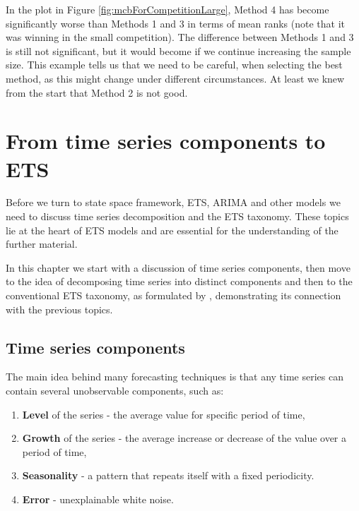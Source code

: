 \documentclass[
]{book}
\providecommand{\tightlist}{%
  \setlength{\itemsep}{0pt}\setlength{\parskip}{0pt}}
\theoremstyle{definition}
\theoremstyle{definition}
\theoremstyle{definition}
\theoremstyle{definition}
\theoremstyle{remark}
\begin{document}
In the plot in Figure \ref{fig:mcbForCompetitionLarge}, Method 4 has become significantly worse than Methods 1 and 3 in terms of mean ranks (note that it was winning in the small competition). The difference between Methods 1 and 3 is still not significant, but it would become if we continue increasing the sample size. This example tells us that we need to be careful, when selecting the best method, as this might change under different circumstances. At least we knew from the start that Method 2 is not good.

\hypertarget{tsDecomposition}{%
\chapter{From time series components to ETS}\label{tsDecomposition}}

Before we turn to state space framework, ETS, ARIMA and other models we need to discuss time series decomposition and the ETS taxonomy. These topics lie at the heart of ETS models and are essential for the understanding of the further material.

In this chapter we start with a discussion of time series components, then move to the idea of decomposing time series into distinct components and then to the conventional ETS taxonomy, as formulated by \citet{Hyndman2008b}, demonstrating its connection with the previous topics.

\hypertarget{tsComponents}{%
\section{Time series components}\label{tsComponents}}

The main idea behind many forecasting techniques is that any time series can contain several unobservable components, such as:

\begin{enumerate}
\def\labelenumi{\arabic{enumi}.}
\tightlist
\item
  \textbf{Level} of the series - the average value for specific period of time,
\item
  \textbf{Growth} of the series - the average increase or decrease of the value over a period of time,
\item
  \textbf{Seasonality} - a pattern that repeats itself with a fixed periodicity.
\item
  \textbf{Error} - unexplainable white noise.
\end{enumerate}
\end{document}
